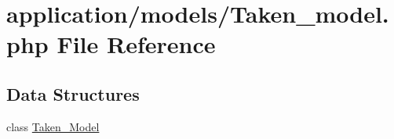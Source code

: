 \hypertarget{_taken__model_8php}{}\section{application/models/\+Taken\+\_\+model.php File Reference}
\label{_taken__model_8php}
\subsection*{Data Structures}
\begin{DoxyCompactItemize}
\item 
class \mbox{\hyperlink{class_taken___model}{Taken\+\_\+\+Model}}
\end{DoxyCompactItemize}

